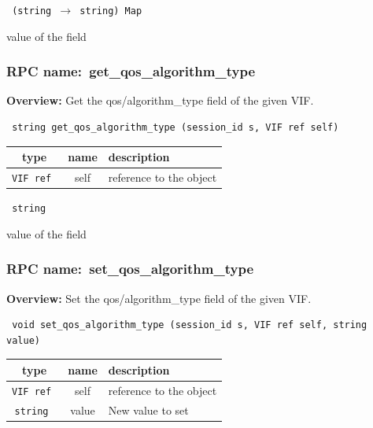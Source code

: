 \vspace{0.3cm}

{\tt 
(string $\rightarrow$ string) Map
}


value of the field
\vspace{0.3cm}
\vspace{0.3cm}
\vspace{0.3cm}
\subsubsection{RPC name:~get\_qos\_algorithm\_type}

{\bf Overview:} 
Get the qos/algorithm\_type field of the given VIF.

\begin{verbatim} string get_qos_algorithm_type (session_id s, VIF ref self)\end{verbatim}



 
\vspace{0.3cm}
\begin{tabular}{|c|c|p{7cm}|}
 \hline
{\bf type} & {\bf name} & {\bf description} \\ \hline
{\tt VIF ref } & self & reference to the object \\ \hline 

\end{tabular}

\vspace{0.3cm}

{\tt 
string
}


value of the field
\vspace{0.3cm}
\vspace{0.3cm}
\vspace{0.3cm}
\subsubsection{RPC name:~set\_qos\_algorithm\_type}

{\bf Overview:} 
Set the qos/algorithm\_type field of the given VIF.

\begin{verbatim} void set_qos_algorithm_type (session_id s, VIF ref self, string value)\end{verbatim}



 
\vspace{0.3cm}
\begin{tabular}{|c|c|p{7cm}|}
 \hline
{\bf type} & {\bf name} & {\bf description} \\ \hline
{\tt VIF ref } & self & reference to the object \\ \hline 

{\tt string } & value & New value to set \\ \hline 

\end{tabular}


